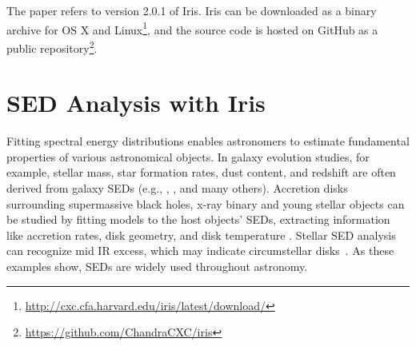 \documentclass[preprint,authoryear,5p]{elsarticle}
\begin{document}
The paper refers to version 2.0.1 of Iris. Iris can be downloaded as a binary
archive for OS X and
Linux\footnote{\url{http://cxc.cfa.harvard.edu/iris/latest/download/}}, and the
source code is hosted on GitHub as a public
repository\footnote{\url{https://github.com/ChandraCXC/iris}}.

\section{SED Analysis with Iris} \label{sec:overview}

Fitting spectral energy distributions enables astron\-omers to estimate fundamental 
properties of various astronomical objects. 
In galaxy evolution studies, for example, stellar mass, star formation rates, dust content, and redshift
are often derived from galaxy SEDs (e.g.\citet{1998AJ....115.1329S},
\citet{2001ApJS..137..139S}, \citet{2007ApJS..169..328R}, and many others). 
Accretion disks surrounding supermassive black holes, x-ray binary and young stellar objects can be studied by
fitting models to the host objects' SEDs, extracting information like 
accretion rates, disk geometry, and disk temperature \citep[e.g.,][]{1987ApJ...321..305C,1990A&A...235..162V,1997ApJ...490..368C,2006ApJS..167..256R}. 
Stellar SED analysis can recognize mid IR excess, which may indicate circumstellar 
disks~\citep{2000prpl.conf..639L,2005ApJ...623..493C}. As these examples show, SEDs 
are widely used throughout astronomy.


\end{document}
